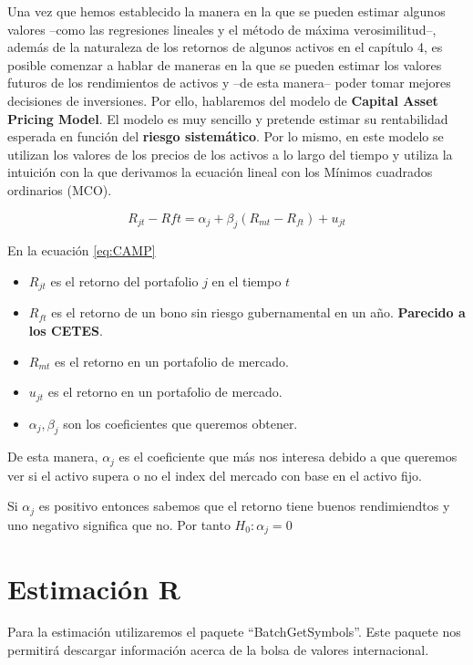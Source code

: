 \documentclass[
]{book}
\begin{document}
Una vez que hemos establecido la manera en la que se pueden estimar algunos valores --como las regresiones lineales y el método de máxima verosimilitud--, además de la naturaleza de los retornos de algunos activos en el capítulo 4, es posible comenzar a hablar de maneras en la que se pueden estimar los valores futuros de los rendimientos de activos y --de esta manera-- poder tomar mejores decisiones de inversiones. Por ello, hablaremos del modelo de \textbf{Capital Asset Pricing Model}. El modelo es muy sencillo y pretende estimar su rentabilidad esperada en función del \textbf{riesgo sistemático}. Por lo mismo, en este modelo se utilizan los valores de los precios de los activos a lo largo del tiempo y utiliza la intuición con la que derivamos la ecuación lineal con los Mínimos cuadrados ordinarios (MCO).

\begin{equation}
    R_{jt}-R{ft}=\alpha_{j}+\beta_j(R_{mt}-R_{ft})+u_{jt}
\label{eq:CAMP}
\end{equation}

En la ecuación \eqref{eq:CAMP}

\begin{itemize}
\item
  \(R_{jt}\) es el retorno del portafolio \(j\) en el tiempo \(t\)
\item
  \(R_{ft}\) es el retorno de un bono sin riesgo gubernamental en un año. \textbf{Parecido a los CETES}.
\item
  \(R_{mt}\) es el retorno en un portafolio de mercado.
\item
  \(u_{jt}\) es el retorno en un portafolio de mercado.
\item
  \(\alpha_{j},\beta_j\) son los coeficientes que queremos obtener.
\end{itemize}

De esta manera, \(\alpha_j\) es el coeficiente que más nos interesa debido a que queremos ver si el activo supera o no el index del mercado con base en el activo fijo.

Si \(\alpha_j\) es positivo entonces sabemos que el retorno tiene buenos rendimiendtos y uno negativo significa que no. Por tanto \(H_0:\alpha_j=0\)

\hypertarget{estimaciuxf3n-r-1}{%
\section{Estimación R}\label{estimaciuxf3n-r-1}}

Para la estimación utilizaremos el paquete ``BatchGetSymbols''. Este paquete nos permitirá descargar información acerca de la bolsa de valores internacional.
\end{document}
